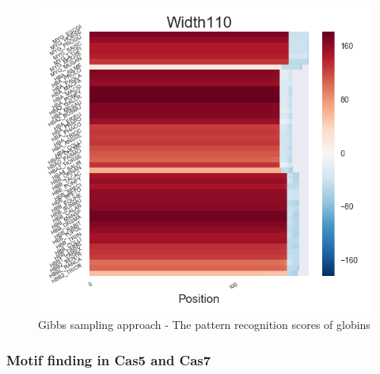 \documentclass[11pt, oneside]{article}
\begin{document}
\begin{figure}[htbp]
\begin{minipage}{0.32\textwidth}
  \end{minipage}
  \hfill
  \begin{minipage}{0.32\textwidth}
    \centering
    \includegraphics[width=1\textwidth]{images/Width110_heatmap} %
  \end{minipage}
  \caption{Gibbs sampling approach - The pattern recognition scores of globins}
  \label{fig:recog}
\end{figure}

\subsubsection{Motif finding in Cas5 and Cas7}
\end{document}
